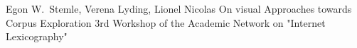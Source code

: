 \documentclass[11pt,a4paper]{moderncv}
\begin{document}
        {Egon W.~Stemle, Verena Lyding, Lionel Nicolas}
        {\small On visual Approaches towards Corpus Exploration}
        {\small 3rd Workshop of the Academic Network on "Internet Lexicography"}
        {\small}
        {}



\end{document}
